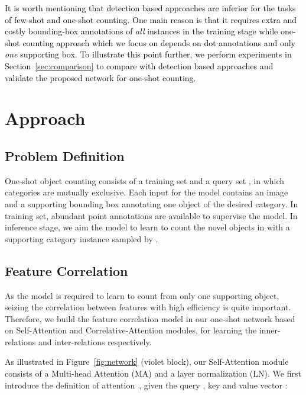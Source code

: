 \documentclass{article}
\newcommand\XP[1]{\textcolor{black}{#1}}\newcommand\XPC[1]{\textcolor{black}{[#1]}}
\begin{document}
\XP{It is worth mentioning that detection based approaches \cite{lin2017focal, ren2015faster, he2017mask} are inferior for the tasks of few-shot and one-shot counting. One main reason is that it requires extra and costly bounding-box annotations of \emph{all} instances in the training stage while \XP{one-shot counting approach which we focus on} depends on dot annotations and only \emph{one} supporting box. To illustrate this point further, 
we perform experiments in Section~\ref{sec:comparison} to compare with detection based approaches and validate the proposed network for one-shot counting.}








\section{Approach}

\subsection{Problem Definition}

One-shot object counting consists of a training set  and a query set , in which categories are mutually exclusive. Each input for the model contains an image  and a supporting bounding box  annotating one object of the desired category. In training set, abundant point annotations  are available to supervise the model. In inference stage, we aim the model to learn to count the novel objects in  with a supporting category instance sampled by .

\subsection{Feature Correlation}
As the model is required to learn to count from only one supporting object, seizing the correlation between features with high efficiency is quite important. Therefore, we build the feature correlation model in our one-shot network based on Self-Attention and Correlative-Attention modules, for learning the inner-relations and inter-relations respectively. 

As illustrated in Figure~\ref{fig:network} (violet block), our Self-Attention module consists of a Multi-head Attention (MA) and a layer normalization (LN). We first introduce the definition of attention~\cite{vaswani2017attention}, given the query , key  and value vector :
\end{document}
